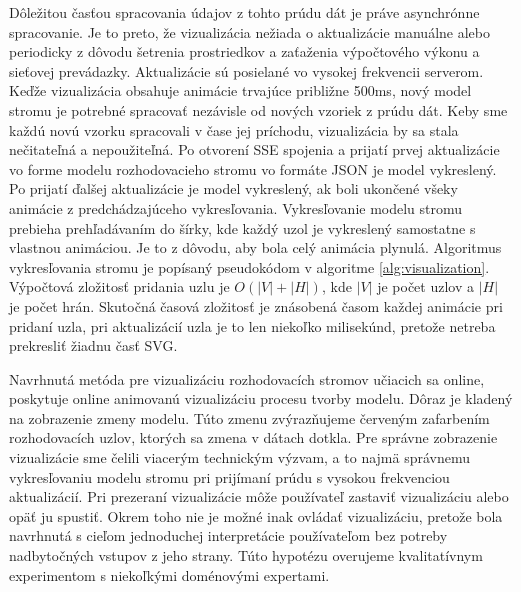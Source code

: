 Dôležitou časťou spracovania údajov z tohto prúdu dát je práve asynchrónne spracovanie. Je to preto, že vizualizácia nežiada o aktualizácie manuálne alebo periodicky z dôvodu šetrenia prostriedkov a zaťaženia výpočtového výkonu a sieťovej prevádazky. Aktualizácie sú posielané vo vysokej frekvencii serverom. Keďže vizualizácia obsahuje animácie trvajúce približne 500ms, nový model stromu je potrebné spracovať nezávisle od nových vzoriek z prúdu dát. Keby sme každú novú vzorku spracovali v čase jej príchodu, vizualizácia by sa stala nečitateľná a nepoužiteľná. Po otvorení SSE spojenia a prijatí prvej aktualizácie vo forme modelu rozhodovacieho stromu vo formáte JSON je model vykreslený. Po prijatí ďalšej aktualizácie je model vykreslený, ak boli ukončené všeky animácie z predchádzajúceho vykresľovania. Vykresľovanie modelu stromu prebieha prehľadávaním do šírky, kde každý uzol je vykreslený samostatne s vlastnou animáciou. Je to z dôvodu, aby bola celý animácia plynulá. Algoritmus vykresľovania stromu je popísaný pseudokódom v algoritme \ref{alg:visualization}. Výpočtová zložitosť pridania uzlu je $O(|V| + |H|)$, kde $|V|$ je počet uzlov a $|H|$ je počet hrán. Skutočná časová zložitosť je znásobená časom každej animácie pri pridaní uzla, pri aktualizácií uzla je to len niekoľko milisekúnd, pretože netreba prekresliť žiadnu časť SVG.
\par
Navrhnutá metóda pre vizualizáciu rozhodovacích stromov učiacich sa online, poskytuje online animovanú vizualizáciu procesu tvorby modelu. Dôraz je kladený na zobrazenie zmeny modelu. Túto zmenu zvýrazňujeme červeným zafarbením rozhodovacích uzlov, ktorých sa zmena v dátach dotkla. Pre správne zobrazenie vizualizácie sme čelili viacerým technickým výzvam, a to najmä správnemu vykresľovaniu modelu stromu pri prijímaní prúdu s vysokou frekvenciou aktualizácií. Pri prezeraní vizualizácie môže používateľ zastaviť vizualizáciu alebo opäť ju spustiť. Okrem toho nie je možné inak ovládať vizualizáciu, pretože bola navrhnutá s cieľom jednoduchej interpretácie používateľom bez potreby nadbytočných vstupov z jeho strany. Túto hypotézu overujeme kvalitatívnym experimentom s niekoľkými doménovými expertami.
\par
